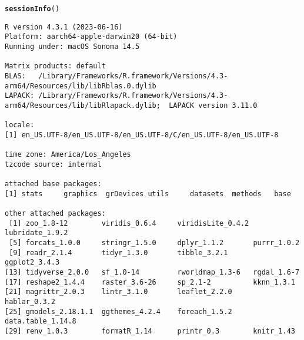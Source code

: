 \documentclass{article}\usepackage[]{graphicx}\usepackage[]{xcolor}
\makeatletter
\newcommand{\hlstd}[1]{\textcolor[rgb]{0.345,0.345,0.345}{#1}}%
\newcommand{\hlkwd}[1]{\textcolor[rgb]{0.737,0.353,0.396}{\textbf{#1}}}%
\newenvironment{kframe}{%
 \def\at@end@of@kframe{}%
 \ifinner\ifhmode%
  \def\at@end@of@kframe{\end{minipage}}%
  \begin{minipage}{\columnwidth}%
 \fi\fi%
 \def\FrameCommand##1{\hskip\@totalleftmargin \hskip-\fboxsep
 \colorbox{shadecolor}{##1}\hskip-\fboxsep
     \hskip-\linewidth \hskip-\@totalleftmargin \hskip\columnwidth}%
 \MakeFramed {\advance\hsize-\width
   \@totalleftmargin\z@ \linewidth\hsize
   \@setminipage}}%
 {\par\unskip\endMakeFramed%
 \at@end@of@kframe}
\newenvironment{knitrout}{}{} %
\makeatother
\begin{document}
\begin{knitrout}\footnotesize
{}\color{fgcolor}\begin{kframe}
\begin{alltt}
\hlkwd{sessionInfo}\hlstd{()}
\end{alltt}
\begin{verbatim}
R version 4.3.1 (2023-06-16)
Platform: aarch64-apple-darwin20 (64-bit)
Running under: macOS Sonoma 14.5

Matrix products: default
BLAS:   /Library/Frameworks/R.framework/Versions/4.3-arm64/Resources/lib/libRblas.0.dylib 
LAPACK: /Library/Frameworks/R.framework/Versions/4.3-arm64/Resources/lib/libRlapack.dylib;  LAPACK version 3.11.0

locale:
[1] en_US.UTF-8/en_US.UTF-8/en_US.UTF-8/C/en_US.UTF-8/en_US.UTF-8

time zone: America/Los_Angeles
tzcode source: internal

attached base packages:
[1] stats     graphics  grDevices utils     datasets  methods   base     

other attached packages:
 [1] zoo_1.8-12        viridis_0.6.4     viridisLite_0.4.2 lubridate_1.9.2  
 [5] forcats_1.0.0     stringr_1.5.0     dplyr_1.1.2       purrr_1.0.2      
 [9] readr_2.1.4       tidyr_1.3.0       tibble_3.2.1      ggplot2_3.4.3    
[13] tidyverse_2.0.0   sf_1.0-14         rworldmap_1.3-6   rgdal_1.6-7      
[17] reshape2_1.4.4    raster_3.6-26     sp_2.1-2          kknn_1.3.1       
[21] magrittr_2.0.3    lintr_3.1.0       leaflet_2.2.0     hablar_0.3.2     
[25] gmodels_2.18.1.1  ggthemes_4.2.4    foreach_1.5.2     data.table_1.14.8
[29] renv_1.0.3        formatR_1.14      printr_0.3        knitr_1.43       


\end{verbatim}
\end{kframe}
\end{knitrout}
\end{document}
